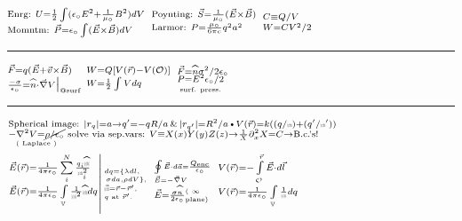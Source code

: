 \documentclass{article}
\newcommand{\YgorUD}[2]{\,\!^{#1}_{#2}}
\def\rcurst{{\mbox{$\resizebox{0.9ex}{0.3em}{\texttt{[image: ScriptRResized]}}$}}}
\begin{document}
\begin{multicols}{2}
$\YgorUD{%
        \text{Enrg: } U = \frac{1}{2} \int  ( \epsilon_{ \circ}  E^{2}  + %
        \frac{1}{\mu_{ \circ}}   B^{2} ) dV%
    }{%
        \text{Momntm: } \vec{P} = \epsilon_{ \circ}  \int ( \vec{E}\times\vec{B} ) dV%
    }  $\hfill\textbullet\hfill%
    $  \YgorUD{%
        \text{Poynting: } \vec{S} = \frac{1}{\mu_{ \circ}} ( \vec{E}\times\vec{B} )%
    }{%
        \text{Larmor: } P = \frac{\mu_{ \circ}}{6\pi c} q^{2} a^{2}%
    }  $\hfill\textbullet\hfill%
    $\YgorUD{%
        C \equiv  Q / V%
    }{%
        W = C V^{ 2}  / 2%
    }$
\hrule

$\YgorUD{%
        \vec{F} = q(\vec{E} + \vec{v}\times\vec{B})%
    }{%
        \frac{-\sigma}{\epsilon_{ \circ}}  = %
        \widehat{n}\cdot \vec{\nabla} V \big|%
        _{\text{@surf}}%
    }$\hfill\textbullet\hfill%
    $\YgorUD{%
        W = Q[ V ( \vec{r})  - V ( \mathcal{O} ) ]%
    }{%
        W =\frac{1}{2}  \int  Vdq%
    }$\hfill\textbullet\hfill%
    $\YgorUD{%
        \vec{F} =\widehat{n}\sigma^{2}  / 2\epsilon_{ \circ}%
    }{%
        \smash{\underset{\text{surf. press.}}{P =%
        E^{2}\epsilon_{ \circ} / 2}}%
    }$\hfill\textbullet\hfill%
    $\YgorUD{%
        \,%
    }{%
        \,%
    }$
\hrule

$\YgorUD{%
        \text{Spherical image: }%
        | r_{ q} | = a \rightarrow q' = - qR  / a\,\&\,%
        \smash{| r_{ q'} |} = R^{2}  /a%
        \text{\textbullet}%
        V ( \vec{r}) = k( ( q / \rcurst ) + ( q ' / \rcurst ' ) )%
    }{%
        \smash{\underset{\text{( Laplace )}}{   - \nabla^{2} V = \smash{\cancel{\rho  / \epsilon_{ \circ}}}}}
        \text{ solve via sep.vars: }%
        V \equiv\smash{ X ( x ) Y ( y ) Z ( z )%
        \rightarrow\frac{1}{X} \partial_{x}^{2}X = C \rightarrow} \text{B.c.'s!}%
    }$



$\left.\YgorUD{%
        \vec{E}( \vec{r}) = \frac{1}{4 \pi \epsilon_{ \circ}} %
        \sum\limits_{i}^{N}   \frac{q_{i} \widehat{\rcurst}}{\rcurst^{2}_{i}}%
    }{%
        \vec{E}( \vec{r}) = \frac{1}{4 \pi \epsilon_{ \circ}} %
        \int\limits_{\mathbb{V}}   \frac{1}{\rcurst^{2}}%
        \widehat{\rcurst} dq%
    }\right|%
    \YgorUD{%
        \YgorUD{%
            dq=\{\lambda dl , %
        }{%
            \,\sigma da , \rho dV \} ,%
        }%
    }{%
        \YgorUD{%
            \vec{\rcurst}=\vec{r}-\vec{r}',%
        }{%
            q\text{ at }\vec{r}'.%
        }%
    }    $\hfill\textbullet\hfill%
    $\YgorUD{%
        \YgorUD{%
            \oint   \vec{E}\cdot d\vec{a}=%
            \smash{\frac{Q_{\text{enc}}}{\epsilon_{ \circ}}}%
        }{%
            \vec{E} = -\vec{\nabla} V%
        }%
    }{%
        \vec{E} = \frac{\sigma \widehat{n}}{2\epsilon_{ \circ}}%
        \YgorUD{\text{\tiny ( $\infty$}%
        }{\text{\tiny plane)}}%
    }    $\hfill\textbullet\hfill%
    $\YgorUD{%
        V ( \vec{r})  = - \int\limits_{\mathcal{O}}^{\vec{r}}   %
        \vec{E}\cdot d\vec{l}%
    }{%
        V ( \vec{r}) = \frac{1}{4 \pi \epsilon_{ \circ}} %
        \int\limits_{\mathbb{V}}   \frac{1}{\rcurst}%
        dq%
    }$


\end{multicols}
\end{document}

